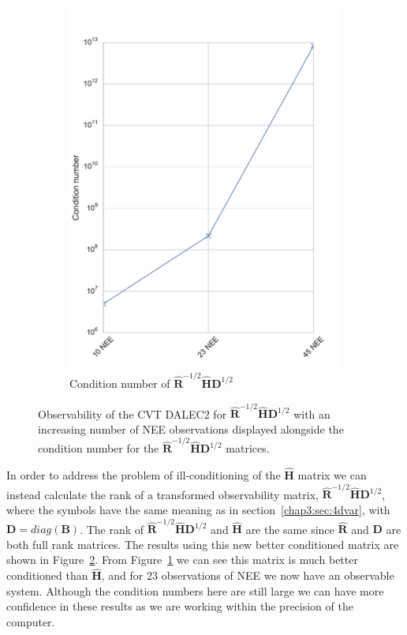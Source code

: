 \begin{figure}[ht]
\begin{subfigure}[b]{0.4\textwidth}
        \includegraphics[width=\textwidth]{chapter/chapter5/dalec2_obsrankcvtcond.pdf}
        \caption{Condition number of $\hat{\textbf{R}}^{-1/2}\hat{\textbf{H}}\textbf{D}^{1/2}$}
        \label{chap5:fig:D2_observabilitycondcvt}
    \end{subfigure}
    \caption{Observability of the CVT DALEC2 for $\hat{\textbf{R}}^{-1/2}\hat{\textbf{H}}\textbf{D}^{1/2}$ with an increasing number of NEE observations displayed alongside the condition number for the $\hat{\textbf{R}}^{-1/2}\hat{\textbf{H}}\textbf{D}^{1/2}$ matrices.}
    \label{chap5:fig:D2_cvtobservability}
\end{figure}

In order to address the problem of ill-conditioning of the $\hat{\textbf{H}}$ matrix we can instead calculate the rank of a transformed observability matrix, $\hat{\textbf{R}}^{-1/2}\hat{\textbf{H}}\textbf{D}^{1/2}$, where the symbols have the same meaning as in section~\ref{chap3:sec:4dvar}, with $\textbf{D} = diag(\textbf{B})$. The rank of $\hat{\textbf{R}}^{-1/2}\hat{\textbf{H}}\textbf{D}^{1/2}$ and $\hat{\textbf{H}}$ are the same since $\hat{\textbf{R}}$ and $\textbf{D}$ are both full rank matrices. The results using this new better conditioned matrix are shown in Figure~\ref{chap5:fig:D2_cvtobservability}. From Figure~\ref{chap5:fig:D2_observabilitycondcvt} we can see this matrix is much better conditioned than $\hat{\textbf{H}}$, and for 23 observations of NEE we now have an observable system. Although the condition numbers here are still large we can have more confidence in these results as we are working within the precision of the computer.

